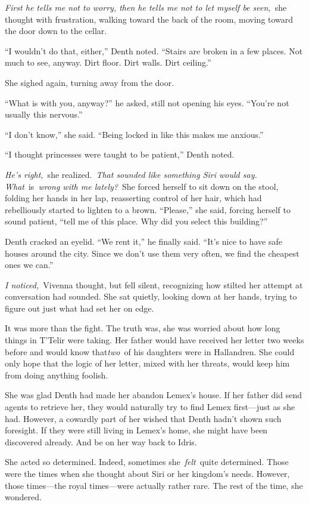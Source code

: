 \textit{First he tells me not to worry, then he tells me not to let myself be seen,}~she thought with frustration, walking toward the back of the room, moving toward the door down to the cellar.

“I wouldn’t do that, either,” Denth noted. “Stairs are broken in a few places. Not much to see, anyway. Dirt floor. Dirt walls. Dirt ceiling.”

She sighed again, turning away from the door.

“What is with you, anyway?” he asked, still not opening his eyes. “You’re not usually this nervous.”

“I don’t know,” she said. “Being locked in like this makes me anxious.”

“I thought princesses were taught to be patient,” Denth noted.

\textit{He’s right,}~she realized.~\textit{That sounded like something Siri would say. What}~is~\textit{wrong with me lately?}~She forced herself to sit down on the stool, folding her hands in her lap, reasserting control of her hair, which had rebelliously started to lighten to a brown. “Please,” she said, forcing herself to sound patient, “tell me of this place. Why did you select this building?”

Denth cracked an eyelid. “We rent it,” he finally said. “It’s nice to have safe houses around the city. Since we don’t use them very often, we find the cheapest ones we can.”

\textit{I noticed,}~Vivenna thought, but fell silent, recognizing how stilted her attempt at conversation had sounded. She sat quietly, looking down at her hands, trying to figure out just what had set her on edge.

It was more than the fight. The truth was, she was worried about how long things in T’Telir were taking. Her father would have received her letter two weeks before and would know that\textit{two}~of his daughters were in Hallandren. She could only hope that the logic of her letter, mixed with her threats, would keep him from doing anything foolish.

She was glad Denth had made her abandon Lemex’s house. If her father did send agents to retrieve her, they would naturally try to find Lemex first—just as she had. However, a cowardly part of her wished that Denth hadn’t shown such foresight. If they were still living in Lemex’s home, she might have been discovered already. And be on her way back to Idris.

She acted so determined. Indeed, sometimes she~\textit{felt}~quite determined. Those were the times when she thought about Siri or her kingdom’s needs. However, those times—the royal times—were actually rather rare. The rest of the time, she wondered.

